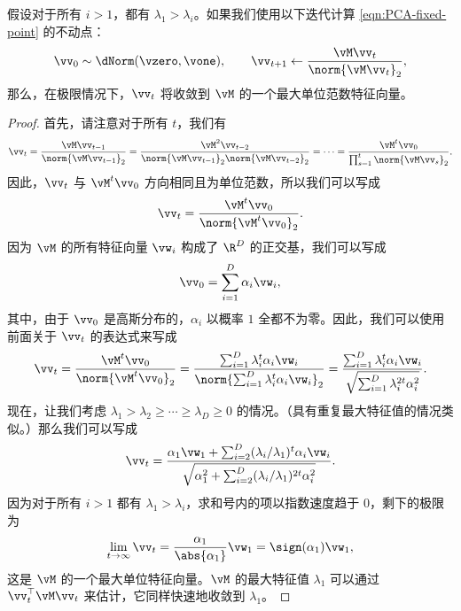 \documentclass[../../book-main_zh.tex]{subfiles}
\begin{document}
\begin{theorem}[幂迭代]
    假设对于所有 \(i > 1\)，都有 \(\lambda_{1} > \lambda_{i}\)。如果我们使用以下迭代计算
    \eqref{eqn:PCA-fixed-point} 的不动点：
    \begin{equation}\label{eq:power_iteration}
        \vv_{0} \sim \dNorm(\vzero, \vone), \qquad \vv_{t + 1} \gets
        \frac{\vM\vv_{t}}{\norm{\vM\vv_{t}}_{2}},
    \end{equation}
    那么，在极限情况下，\(\vv_{t}\) 将收敛到 \(\vM\) 的一个最大单位范数特征向量。
\end{theorem}

\begin{proof} 首先，请注意对于所有 \(t\)，我们有
    \begin{equation}
        \vv_{t} = \frac{\vM\vv_{t - 1}}{\norm{\vM\vv_{t - 1}}_{2}} =
        \frac{\vM^{2}\vv_{t - 2}}{\norm{\vM\vv_{t -
        1}}_{2}\norm{\vM\vv_{t - 2}}_{2}} = \cdots =
        \frac{\vM^{t}\vv_{0}}{\prod_{s = 1}^{t}\norm{\vM\vv_{s}}_{2}}.
    \end{equation}
    因此，\(\vv_{t}\) 与 \(\vM^{t}\vv_{0}\) 方向相同且为单位范数，所以我们可以写成
    \begin{equation}
        \vv_{t} = \frac{\vM^{t}\vv_{0}}{\norm{\vM^{t}\vv_{0}}_{2}}.
    \end{equation}
    因为 $\vM$ 的所有特征向量 \(\vw_{i}\) 构成了 \(\R^{D}\) 的正交基，我们可以写成
    \begin{equation}
        \vv_{0} = \sum_{i = 1}^{D}\alpha_{i}\vw_{i},
    \end{equation}
    其中，由于 \(\vv_{0}\) 是高斯分布的，\(\alpha_{i}\) 以概率 \(1\)
    全都不为零。因此，我们可以使用前面关于 \(\vv_{t}\) 的表达式来写成
    \begin{equation}
        \vv_{t} = \frac{\vM^{t}\vv_{0}}{\norm{\vM^{t}\vv_{0}}_{2}} =
        \frac{\sum_{i =
        1}^{D}\lambda_{i}^{t}\alpha_{i}\vw_{i}}{\norm{\sum_{i =
        1}^{D}\lambda_{i}^{t}\alpha_{i}\vw_{i}}_{2}} = \frac{\sum_{i
        = 1}^{D}\lambda_{i}^{t}\alpha_{i}\vw_{i}}{\sqrt{\sum_{i =
        1}^{D}\lambda_{i}^{2t}\alpha_{i}^{2}}}.
    \end{equation}
    现在，让我们考虑 \(\lambda_{1} > \lambda_{2}
    \geq \cdots \geq \lambda_{D} \geq 0\) 的情况。（具有重复最大特征值的情况类似。）那么我们可以写成
    \begin{equation}
        \vv_{t} = \frac{\alpha_{1}\vw_{1} + \sum_{i =
        2}^{D}(\lambda_{i}/\lambda_{1})^{t}\alpha_{i}\vw_{i}}{\sqrt{\alpha_{1}^{2}
        + \sum_{i = 2}^{D}(\lambda_{i}/\lambda_{1})^{2t}\alpha_{i}^{2}}}.
    \end{equation}
    因为对于所有 \(i > 1\) 都有 \(\lambda_{1} > \lambda_{i}\)，求和号内的项以指数速度趋于 \(0\)，剩下的极限为
    \begin{equation}
        \lim_{t \to \infty}\vv_{t} =
        \frac{\alpha_{1}}{\abs{\alpha_{1}}}\vw_{1} = \sign(\alpha_{1})\vw_{1},
    \end{equation}
    这是 \(\vM\) 的一个最大单位特征向量。\(\vM\) 的最大特征值 \(\lambda_{1}\) 可以通过
    \(\vv_{t}^{\top}\vM\vv_{t}\) 来估计，它同样快速地收敛到 \(\lambda_{1}\)。
\end{proof}
\end{document}
